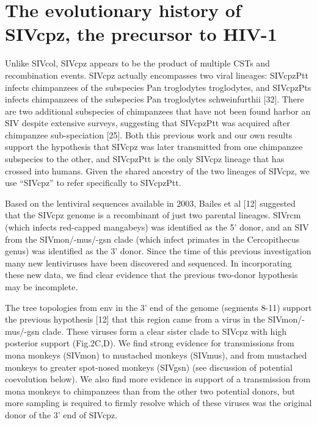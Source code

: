 
\section{The evolutionary history of SIVcpz, the precursor to HIV-1}
Unlike SIVcol, SIVcpz appears to be the product of multiple CSTs and recombination events.
SIVcpz actually encompasses two viral lineages: SIVcpzPtt infects chimpanzees of the subspecies Pan troglodytes troglodytes, and SIVcpzPts infects chimpanzees of the subspecies Pan troglodytes schweinfurthii [32].
There are two additional subspecies of chimpanzees that have not been found harbor an SIV despite extensive surveys, suggesting that SIVcpzPtt was acquired after chimpanzee sub-speciation [25].
Both this previous work and our own results support the hypothesis that SIVcpz was later transmitted from one chimpanzee subspecies to the other, and SIVcpzPtt is the only SIVcpz lineage that has crossed into humans.
Given the shared ancestry of the two lineages of SIVcpz, we use “SIVcpz” to refer specifically to SIVcpzPtt.

Based on the lentiviral sequences available in 2003, Bailes et al [12] suggested that the SIVcpz genome is a recombinant of just two parental lineages.
SIVrcm (which infects red-capped mangabeys) was identified as the 5’ donor, and an SIV from the SIVmon/-mus/-gsn clade (which infect primates in the Cercopithecus genus) was identified as the 3’ donor.
Since the time of this previous investigation many new lentiviruses have been discovered and sequenced.
In incorporating these new data, we find clear evidence that the previous two-donor hypothesis may be incomplete.

The tree topologies from env in the 3’ end of the genome (segments 8-11) support the previous hypothesis [12] that this region came from a virus in the SIVmon/-mus/-gsn clade.
These viruses form a clear sister clade to SIVcpz with high posterior support (Fig.2C,D).
We find strong evidence for transmissions from mona monkeys (SIVmon) to mustached monkeys (SIVmus), and from mustached monkeys to greater spot-nosed monkeys (SIVgsn) (see discussion of potential coevolution below).
We also find more evidence in support of a transmission from mona monkeys to chimpanzees than from the other two potential donors, but more sampling is required to firmly resolve which of these viruses was the original donor of the 3’ end of SIVcpz.

